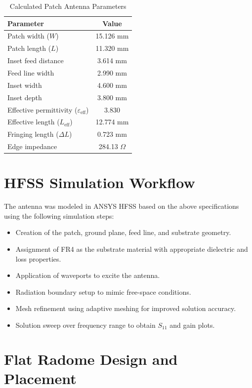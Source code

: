 \begin{table}[htbp]
\centering
\caption{Calculated Patch Antenna Parameters}
\begin{tabular}{lc}
\toprule
\textbf{Parameter} & \textbf{Value} \\
\midrule
Patch width ($W$) & 15.126 mm \\
Patch length ($L$) & 11.320 mm \\
Inset feed distance & 3.614 mm \\
Feed line width & 2.990 mm \\
Inset width & 4.600 mm \\
Inset depth & 3.800 mm \\
Effective permittivity ($\varepsilon_{\text{eff}}$) & 3.830 \\
Effective length ($L_{\text{eff}}$) & 12.774 mm \\
Fringing length ($\Delta L$) & 0.723 mm \\
Edge impedance & 284.13 $\Omega$ \\
\bottomrule
\end{tabular}
\label{tab:calculatedvalues}
\end{table}

\section{HFSS Simulation Workflow}

The antenna was modeled in ANSYS HFSS based on the above specifications using the following simulation steps:

\begin{itemize}
    \item Creation of the patch, ground plane, feed line, and substrate geometry.
    \item Assignment of FR4 as the substrate material with appropriate dielectric and loss properties.
    \item Application of waveports to excite the antenna.
    \item Radiation boundary setup to mimic free-space conditions.
    \item Mesh refinement using adaptive meshing for improved solution accuracy.
    \item Solution sweep over frequency range to obtain $S_{11}$ and gain plots.
\end{itemize}

\section{Flat Radome Design and Placement}

